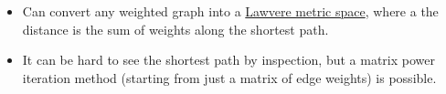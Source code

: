 \begin{itemize}
    \item Can convert any weighted graph into a \href{doc/1 math/Seven Sketches in Compositionality/Chapter 2: Resource theories/3 Enrichment/3 Lawvere metric spaces/2 Lawvere metric space}{Lawvere metric space}, where a the distance is the sum of weights along the shortest path.
    \item It can be hard to see the shortest path by inspection, but a matrix power iteration method (starting from just a matrix of edge weights) is possible.
  \end{itemize}